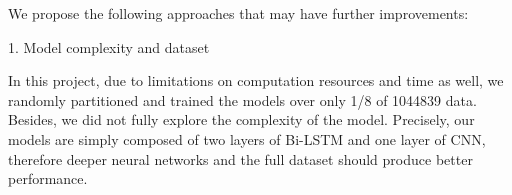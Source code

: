 \documentclass[12pt]{diazessay} %
\begin{document}
We propose the following approaches that may have further improvements:


1. Model complexity and dataset

In this project, due to limitations on computation resources and time as well, we randomly partitioned and trained the models over only 1/8 of \num[group-separator={,}]{1044839} data. Besides, we did not fully explore the complexity of the model. Precisely, our models are simply composed of two layers of Bi-LSTM and one layer of CNN, therefore deeper neural networks and the full dataset should produce better performance.




\clearpage






\newpage
\appendix
\end{document}
